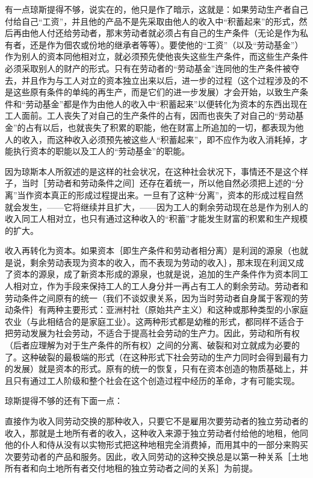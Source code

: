 有一点琼斯提得不够，说实在的，他只是作了暗示，这就是：如果劳动生产者自己付给自己“工资”，并且他的产品不是先采取由他人的收入中“积蓄起来”的形式，然后再由他人付还给劳动者，那末劳动者就必须占有自己的生产条件（无论是作为私有者，还是作为佃农或份地的继承者等等）。要使他的“工资”（以及“劳动基金”）作为别人的资本同他相对立，就必须预先使他丧失这些生产条件，而这些生产条件必须采取别人的财产的形式。只有在劳动者的“劳动基金”连同他的生产条件被夺去，并且作为与工人对立的资本独立出来以后，进一步的过程（这个过程涉及的不是这些原有条件的单纯的再生产，而是它们的进一步发展）才会开始，以致生产条件和“劳动基金”都是作为由他人的收入中“积蓄起来”以便转化为资本的东西出现在工人面前。工人丧失了对自己的生产条件的占有，因而也丧失了对自己的“劳动基金”的占有以后，也就丧失了积累的职能，他在财富上所追加的一切，都表现为他人的收入，而这种收入必须预先被这些人“积蓄起来”，即不应作为收入消耗掉，才能执行资本的职能以及工人的“劳动基金”的职能。

因为琼斯本人所叙述的是这样的社会状况，在这种社会状况下，事情还不是这个样子，当时［劳动者和劳动条件之间］还存在着统一，所以他自然必须把上述的“分离”当作资本真正的形成过程提出来。一旦有了这种“分离”，资本的形成过程自然就会发生，——它将继续并且扩大，——因为工人的剩余劳动现在总是作为别人的收入同工人相对立，也只有通过这种收入的“积蓄”才能发生财富的积累和生产规模的扩大。

收入再转化为资本。如果资本｛即生产条件和劳动者相分离）是利润的源泉（也就是说，剩余劳动表现为资本的收入，而不表现为劳动的收入｝，那末现在利润又成了资本的源泉，成了新资本形成的源泉，也就是说，追加的生产条件作为资本同工人相对立，作为手段来保持工人的工人身分并一再占有工人的剩余劳动。劳动者和劳动条件之间原有的统一（我们不谈奴隶关系，因为当时劳动者自身属于客观的劳动条件｝有两种主要形式：亚洲村社（原始共产主义）和这种或那种类型的小家庭农业（与此相结合的是家庭工业）。这两种形式都是幼稚的形式，都同样不适合于把劳动发展为社会劳动，不适合于提高社会劳动的生产力。因此，劳动和所有权（后者应理解为对于生产条件的所有权）之间的分离、破裂和对立就成为必要的了。这种破裂的最极端的形式（在这种形式下社会劳动的生产力同时会得到最有力的发展）就是资本的形式。原有的统一的恢复，只有在资本创造的物质基础上，并且只有通过工人阶级和整个社会在这个创造过程中经历的革命，才有可能实现。

琼斯提得不够的还有下面一点：

直接作为收入同劳动交换的那种收入，只要它不是雇用次要劳动者的独立劳动者的收入，那就是土地所有者的收入，这种收入来源于独立劳动者付给他的地租，他同他的仆人和侍从没有以实物形式把这种地租完全消费掉，而用其中的一部分来购买次要劳动者的产品和服务。因此，收入同劳动的这种交换总是以第一种关系［土地所有者和向土地所有者交付地租的独立劳动者之间的关系］为前提。

